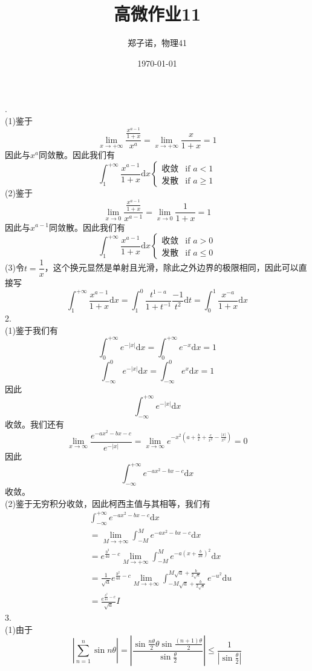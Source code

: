 \documentclass[utf8]{ctexart}
\title{高微作业11}
\author{郑子诺，物理41}
\date{\today}
\begin{document}
\maketitle
{}.\\
(1)鉴于
\[\lim_{x\rightarrow+\infty}\frac{\frac{x^{a-1}}{1+x}}{x^a}=\lim_{x\rightarrow+\infty}\frac{x}{1+x}=1\]
因此与$x^a$同敛散。因此我们有
\[\int_{1}^{+\infty}\frac{x^{a-1}}{1+x}\mathrm{d}x\begin{cases}
	\text{收敛}&\text{if }a<1\\
	\text{发散}&\text{if }a\ge1
\end{cases}\]
(2)鉴于
\[\lim_{x\rightarrow0}\frac{\frac{x^{a-1}}{1+x}}{x^{a-1}}=\lim_{x\rightarrow0}\frac{1}{1+x}=1\]
因此与$x^{a-1}$同敛散。因此我们有
\[\int_{1}^{+\infty}\frac{x^{a-1}}{1+x}\mathrm{d}x\begin{cases}
	\text{收敛}&\text{if }a>0\\
	\text{发散}&\text{if }a\le0
\end{cases}\]
(3)令$t=\dfrac{1}{x}$，这个换元显然是单射且光滑，除此之外边界的极限相同，因此可以直接写
\[\int_{1}^{+\infty}\frac{x^{a-1}}{1+x}\mathrm{d}x=\int_{1}^{0}\frac{t^{1-a}}{1+t^{-1}}\frac{-1}{t^2}\mathrm{d}t=\int_{0}^{1}\frac{x^{-a}}{1+x}\mathrm{d}x\]
2.\\
(1)鉴于我们有
\[\int_{0}^{+\infty}e^{-|x|}\mathrm{d}x=\int_{0}^{+\infty}e^{-x}\mathrm{d}x=1\]
\[\int_{-\infty}^{0}e^{-|x|}\mathrm{d}x=\int_{-\infty}^{0}e^{x}\mathrm{d}x=1\]
因此
\[\int_{-\infty}^{+\infty}e^{-|x|}\mathrm{d}x\]
收敛。我们还有
\[\lim_{x\rightarrow\infty}\frac{e^{-ax^2-bx-c}}{e^{-|x|}}=\lim_{x\rightarrow\infty}e^{-x^2(a+\frac{b}{x}+\frac{c}{x^2}-\frac{|x|}{x^2})}=0\]
因此
\[\int_{-\infty}^{+\infty}e^{-ax^2-bx-c}\mathrm{d}x\]
收敛。\\
(2)鉴于无穷积分收敛，因此柯西主值与其相等，我们有
\begin{align*}
	&\int_{-\infty}^{+\infty}e^{-ax^2-bx-c}\mathrm{d}x\\
	&=\lim_{M\rightarrow+\infty}\int_{-M}^{M}e^{-ax^2-bx-c}\mathrm{d}x\\
	&=e^{\frac{b^2}{4a}-c}\lim_{M\rightarrow+\infty}\int_{-M}^{M}e^{-a(x+\frac{b}{2a})^2}\mathrm{d}x\\
	&=\frac{1}{\sqrt{a}}e^{\frac{b^2}{4a}-c}\lim_{M\rightarrow+\infty}\int_{-M\sqrt{a}+\frac{b}{2\sqrt{a}}}^{M\sqrt{a}+\frac{b}{2\sqrt{a}}}e^{-u^2}\mathrm{d}u\\
	&=\frac{e^{\frac{b^2}{4a}-c}}{\sqrt{a}}I
\end{align*}
3.\\
(1)由于
\[|\sum_{n=1}^n\sin n\theta|=|\frac{\sin\frac{n\theta}{2}\theta\sin\frac{(n+1)\theta}{2}}{\sin\frac{\theta}{2}}|\le\frac{1}{|\sin\frac{\theta}{2}|}\]
\end{document}

